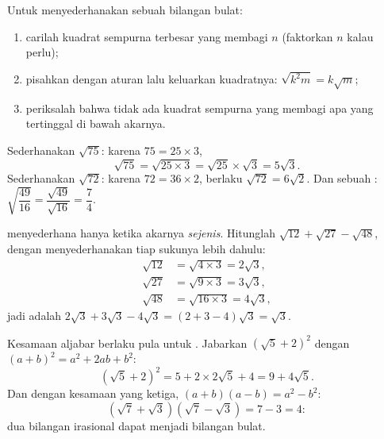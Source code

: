 \begin{method}\label{met:g9:sqrt:simplify}
Untuk menyederhanakan  sebuah bilangan bulat:
\begin{enumerate}
  \item carilah kuadrat sempurna terbesar yang membagi $n$ (faktorkan
        $n$ kalau perlu);
  \item pisahkan dengan aturan  lalu keluarkan
        kuadratnya: $\sqrt{k^2 m} = k\sqrt m$;
  \item periksalah bahwa tidak ada kuadrat sempurna yang membagi apa
        yang tertinggal di bawah akarnya.
\end{enumerate}
\end{method}

\begin{example}\label{ex:g9:sqrt:simplify}
Sederhanakan $\sqrt{75}$: karena $75 = 25 \times 3$,
\[
\sqrt{75} = \sqrt{25 \times 3} = \sqrt{25} \times \sqrt 3 = 5\sqrt3 .
\]
Sederhanakan $\sqrt{72}$: karena $72 = 36 \times 2$, berlaku
$\sqrt{72} = 6\sqrt2$. Dan sebuah :
$\sqrt{\dfrac{49}{16}} = \dfrac{\sqrt{49}}{\sqrt{16}} = \dfrac74$.
\end{example}

\begin{example}\label{ex:g9:sqrt:add}
  menyederhana hanya ketika akarnya \emph{sejenis}.
Hitunglah $\sqrt{12} + \sqrt{27} - \sqrt{48}$, dengan menyederhanakan
tiap sukunya lebih dahulu:
\begin{align*}
\sqrt{12} &= \sqrt{4 \times 3} = 2\sqrt3, \\
\sqrt{27} &= \sqrt{9 \times 3} = 3\sqrt3, \\
\sqrt{48} &= \sqrt{16 \times 3} = 4\sqrt3,
\end{align*}
jadi  adalah $2\sqrt3 + 3\sqrt3 - 4\sqrt3 = (2 + 3 - 4)\sqrt3 = \sqrt3$.
\end{example}

\begin{example}\label{ex:g9:sqrt:expand}
Kesamaan aljabar berlaku pula untuk . Jabarkan
$\left(\sqrt5 + 2\right)^2$ dengan $(a+b)^2 = a^2 + 2ab + b^2$:
\[
\left(\sqrt5 + 2\right)^2 = 5 + 2 \times 2\sqrt5 + 4 = 9 + 4\sqrt5 .
\]
Dan dengan kesamaan yang ketiga, $(a+b)(a-b) = a^2 - b^2$:
\[
\left(\sqrt7 + \sqrt3\right)\left(\sqrt7 - \sqrt3\right) = 7 - 3 = 4 :
\]
 dua bilangan irasional dapat menjadi bilangan bulat.
\end{example}

